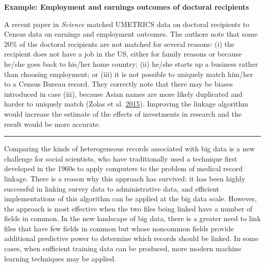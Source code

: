\documentclass[]{krantz}
\begin{document}
\textbf{Example: Employment and earnings outcomes of doctoral
recipients}

A recent paper in \emph{Science} matched UMETRICS data on doctoral
recipients to Census data on earnings and employment outcomes. The
authors note that some 20\% of the doctoral recipients are not matched
for several reasons: (i) the recipient does not have a job in the US,
either for family reasons or because he/she goes back to his/her home
country; (ii) he/she starts up a business rather than choosing
employment; or (iii) it is not possible to uniquely match him/her to a
Census Bureau record. They correctly note that there may be biases
introduced in case (iii), because Asian names are more likely duplicated
and harder to uniquely match (Zolas et al.
\protect\hyperlink{ref-zolas2015wrapping}{2015}). Improving the linkage
algorithm would increase the estimate of the effects of investments in
research and the result would be more accurate.

\begin{center}\rule{0.5\linewidth}{\linethickness}\end{center}

Comparing the kinds of heterogeneous records associated with big data is
a new challenge for social scientists, who have traditionally used a
technique first developed in the 1960s to apply computers to the problem
of medical record linkage. There is a reason why this approach has
survived: it has been highly successful in linking survey data to
administrative data, and efficient implementations of this algorithm can
be applied at the big data scale. However, the approach is most
effective when the two files being linked have a number of fields in
common. In the new landscape of big data, there is a greater need to
link files that have few fields in common but whose noncommon fields
provide additional predictive power to determine which records should be
linked. In some cases, when sufficient training data can be produced,
more modern machine learning techniques may be applied.
\end{document}
